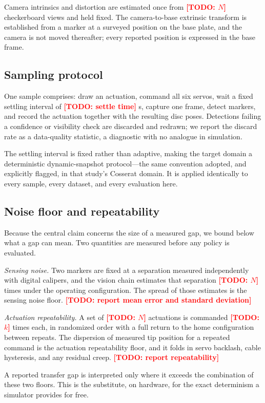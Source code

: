 \documentclass[letterpaper, 10pt, conference]{ieeeconf}
\newcommand{\todo}[1]{\textcolor{red}{\textbf{[TODO: #1]}}}
\begin{document}
Camera intrinsics and distortion are estimated once from
\todo{$N$} checkerboard views and held fixed. The camera-to-base extrinsic
transform is established from a marker at a surveyed position on the base
plate, and the camera is not moved thereafter; every reported position is
expressed in the base frame.

\subsection{Sampling protocol}

One sample comprises: draw an actuation, command all six servos, wait a fixed
settling interval of \todo{settle time} s, capture one frame, detect markers,
and record the actuation together with the resulting disc poses. Detections
failing a confidence or visibility check are discarded and redrawn; we report
the discard rate as a data-quality statistic, a diagnostic with no analogue in
simulation.

The settling interval is fixed rather than adaptive, making the target domain
a deterministic dynamic-snapshot protocol---the same convention adopted, and
explicitly flagged, in that study's Cosserat domain. It is applied
identically to every sample, every dataset, and every evaluation here.

\subsection{Noise floor and repeatability}
\label{sec:noise}

Because the central claim concerns the size of a measured gap, we bound
below what a gap can mean. Two quantities are measured before any policy is
evaluated.

\emph{Sensing noise.} Two markers are fixed at a separation measured
independently with digital calipers, and the vision chain estimates that
separation \todo{$N$} times under the operating configuration. The spread of
those estimates is the sensing noise floor.
\todo{report mean error and standard deviation}

\emph{Actuation repeatability.} A set of \todo{$N$} actuations is commanded
\todo{$k$} times each, in randomized order with a full return to the home
configuration between repeats. The dispersion of measured tip position for a
repeated command is the actuation repeatability floor, and it folds in servo
backlash, cable hysteresis, and any residual creep.
\todo{report repeatability}

A reported transfer gap is interpreted only where it exceeds the combination
of these two floors. This is the substitute, on hardware, for the exact
determinism a simulator provides for free.
\end{document}
